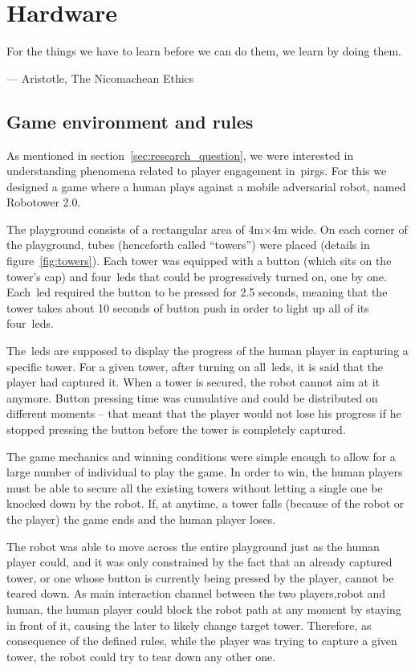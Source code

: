 \chapter{Hardware}\label{ch:foundation}
\epigraph{For the things we have to learn before we can do them, we learn by doing them.}{--- Aristotle, The Nicomachean Ethics}
\section{Game environment and rules}\label{sec:game_environment}
As mentioned in section~\ref{sec:research_question}, we were interested in understanding phenomena related to player engagement in~\glspl{pirg}. For this we designed a game where a human plays against a mobile adversarial robot, named Robotower 2.0.

The playground consists of a rectangular area of 4m$\times$4m wide. On each corner of the playground, tubes (henceforth called ``towers'') were placed (details in figure~\ref{fig:towers}). Each tower was equipped with a button (which sits on the tower's cap) and four~\glspl{led} that could be progressively turned on, one by one.  Each~\gls{led} required the button to be pressed for 2.5 seconds, meaning that the tower takes about 10 seconds of button push in order to light up all of its four~\glspl{led}.

The~\glspl{led} are supposed to display the progress of the human player in capturing a specific tower. For a given tower, after turning on all~\glspl{led}, it is said that the player had captured it. When a tower is secured, the robot cannot aim at it anymore.
Button pressing time was cumulative and could be distributed on different moments -- that meant that the player would not lose his progress if he stopped pressing the button before the tower is completely captured. 

The game mechanics and winning conditions were simple enough to allow for a large number of individual to play the game. In order to win, the human players must be able to secure all the existing towers without letting a single one be knocked down by the robot. If, at anytime, a tower falls (because of the robot or the player) the game ends and the human player loses. 

The robot was able to move across the entire playground just as the human player could, and it was only constrained by the fact that an already captured tower, or one whose button is currently being pressed by the player, cannot be teared down. As main interaction channel between the two players,\ie robot and human, the human player could block the robot path at any moment by staying in front of it, causing the later to likely change target tower. Therefore, as consequence of the defined rules, while the player was trying to capture a given tower, the robot could try to tear down any other one.

